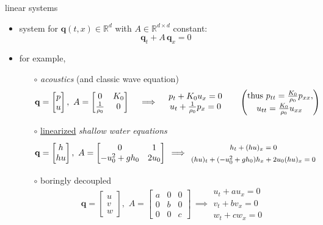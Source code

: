 \documentclass[10pt,hyperref]{beamer}
\newcommand{\bq}{\mathbf{q}}
\newcommand{\RR}{\mathbb{R}}
\begin{document}
\begin{frame}{linear systems}

\begin{itemize}
\item system for $\bq(t,x) \in \RR^d$ with $A\in\RR^{d\times d}$ constant:
  $$\bq_t + A\, \bq_x=0$$
\item for example,
    \begin{itemize}
    \item[$\circ$] \emph{acoustics} (and classic wave equation)
        $$\bq = \begin{bmatrix} p \\ u \end{bmatrix}, \,\, A = \begin{bmatrix} 0 & K_0 \\ \frac{1}{\rho_0} & 0 \end{bmatrix} \quad \implies \quad \begin{matrix} p_t + K_0 u_x = 0 \\ u_t + \frac{1}{\rho_0} p_x = 0 \end{matrix} \qquad \begin{pmatrix} \text{thus } {\large \strut} p_{tt} = \frac{K_0}{\rho_0} p_{xx}, \\ {\large \strut} u_{tt} = \frac{K_0}{\rho_0} u_{xx}\, \end{pmatrix}$$
    \item[$\circ$] \underline{linearized} \emph{shallow water equations}
        $$\bq = \begin{bmatrix} h \\ h u \end{bmatrix}, \,\, A = \begin{bmatrix} 0 & 1 \\ -u_0^2+gh_0 & 2 u_0 \end{bmatrix} \, \implies \, {\footnotesize \begin{matrix} {\large \strut} h_t + (hu)_x = 0 \\ {\large \strut} (h u)_t + (-u_0^2+gh_0) h_x + 2u_0 (h u)_x = 0 \end{matrix} }$$
    \item[$\circ$] boringly decoupled
        $$\bq = \begin{bmatrix} u \\ v \\ w \end{bmatrix}, \,\, A = \begin{bmatrix} a & 0 & 0 \\ 0 & b & 0 \\ 0 & 0 & c \end{bmatrix} \, \implies \begin{matrix} u_t + a u_x = 0 \\ v_t + b v_x = 0 \\ w_t + c w_x = 0 \end{matrix}$$
    \end{itemize}
\end{itemize}
\end{frame}
\end{document}
